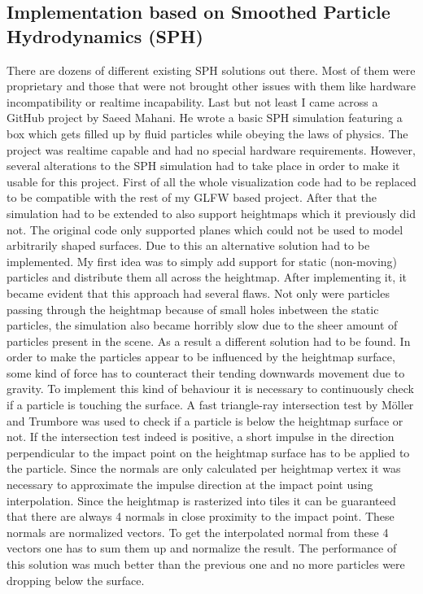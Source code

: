 \documentclass[11pt,a4paper,twoside,openright]{report}
\begin{document}
\subsection{Implementation based on Smoothed Particle Hydrodynamics (SPH)}
There are dozens of different existing SPH solutions out there. Most of them were proprietary and those that were not brought other issues with them like hardware incompatibility or realtime incapability. Last but not least I came across a GitHub project by Saeed Mahani. He wrote a basic SPH simulation featuring a box which gets filled up by fluid particles while obeying the laws of physics. The project was realtime capable and had no special hardware requirements. However, several alterations to the SPH simulation had to take place in order to make it usable for this project. First of all the whole visualization code had to be replaced to be compatible with the rest of my GLFW based project. After that the simulation had to be extended to also support heightmaps which it previously did not. The original code only supported planes which could not be used to model arbitrarily shaped surfaces. Due to this an alternative solution had to be implemented. My first idea was to simply add support for static (non-moving) particles and distribute them all across the heightmap. After implementing it, it became evident that this approach had several flaws. Not only were particles passing through the heightmap because of small holes inbetween the static particles, the simulation also became horribly slow due to the sheer amount of particles present in the scene. As a result a different solution had to be found. In order to make the particles appear to be influenced by the heightmap surface, some kind of force has to counteract their tending downwards movement due to gravity. To implement this kind of behaviour it is necessary to continuously check if a particle is touching the surface. A fast triangle-ray intersection test by Möller and Trumbore \cite{moller2005fast} was used to check if a particle is below the heightmap surface or not. If the intersection test indeed is positive, a short impulse in the direction perpendicular to the impact point on the heightmap surface has to be applied to the particle. Since the normals are only calculated per heightmap vertex it was necessary to approximate the impulse direction at the impact point using interpolation. Since the heightmap is rasterized into tiles it can be guaranteed that there are always 4 normals in close proximity to the impact point. These normals are normalized vectors. To get the interpolated normal from these 4 vectors one has to sum them up and normalize the result. The performance of this solution was much better than the previous one and no more particles were dropping below the surface.
\end{document}
